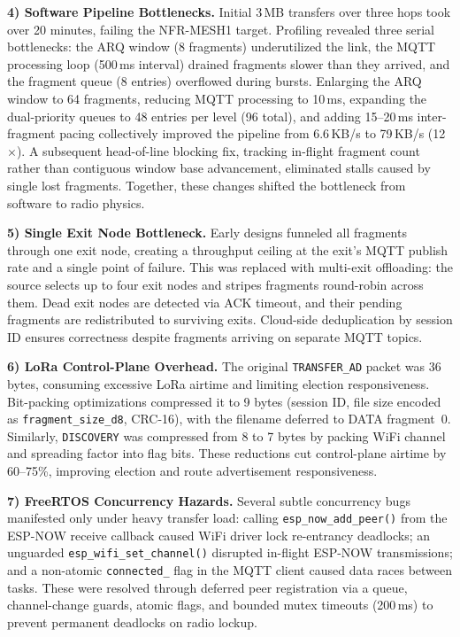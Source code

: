 \documentclass[conference]{IEEEtran}
\begin{document}
\textbf{4) Software Pipeline Bottlenecks.}
Initial 3\,MB transfers over three hops took over 20 minutes, failing the NFR-MESH1 target. Profiling revealed three serial bottlenecks: the ARQ window (8 fragments) underutilized the link, the MQTT processing loop (500\,ms interval) drained fragments slower than they arrived, and the fragment queue (8 entries) overflowed during bursts. Enlarging the ARQ window to 64 fragments, reducing MQTT processing to 10\,ms, expanding the dual-priority queues to 48 entries per level (96 total), and adding 15--20\,ms inter-fragment pacing collectively improved the pipeline from 6.6\,KB/s to 79\,KB/s (12$\times$). A subsequent head-of-line blocking fix, tracking in-flight fragment count rather than contiguous window base advancement, eliminated stalls caused by single lost fragments. Together, these changes shifted the bottleneck from software to radio physics.

\textbf{5) Single Exit Node Bottleneck.}
Early designs funneled all fragments through one exit node, creating a throughput ceiling at the exit's MQTT publish rate and a single point of failure. This was replaced with multi-exit offloading: the source selects up to four exit nodes and stripes fragments round-robin across them. Dead exit nodes are detected via ACK timeout, and their pending fragments are redistributed to surviving exits. Cloud-side deduplication by session ID ensures correctness despite fragments arriving on separate MQTT topics.

\textbf{6) LoRa Control-Plane Overhead.}
The original \texttt{TRANSFER\_AD} packet was 36 bytes, consuming excessive LoRa airtime and limiting election responsiveness. Bit-packing optimizations compressed it to 9 bytes (session ID, file size encoded as \texttt{fragment\_size\_d8}, CRC-16), with the filename deferred to DATA fragment~0. Similarly, \texttt{DISCOVERY} was compressed from 8 to 7 bytes by packing WiFi channel and spreading factor into flag bits. These reductions cut control-plane airtime by 60--75\%, improving election and route advertisement responsiveness.

\textbf{7) FreeRTOS Concurrency Hazards.}
Several subtle concurrency bugs manifested only under heavy transfer load: calling \texttt{esp\_now\_add\_peer()} from the ESP-NOW receive callback caused WiFi driver lock re-entrancy deadlocks; an unguarded \texttt{esp\_wifi\_set\_channel()} disrupted in-flight ESP-NOW transmissions; and a non-atomic \texttt{connected\_} flag in the MQTT client caused data races between tasks. These were resolved through deferred peer registration via a queue, channel-change guards, atomic flags, and bounded mutex timeouts (200\,ms) to prevent permanent deadlocks on radio lockup.
\end{document}
